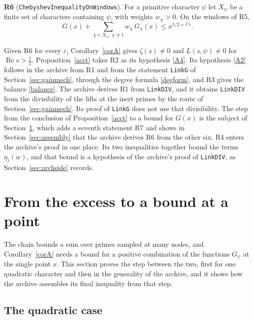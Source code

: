 \documentclass[11pt,letterpaper]{article}
\numberwithin{equation}{section}
\begin{document}
\noindent\textbf{R6} (\texttt{ChebyshevInequalityOnWindows}). For a primitive character $\psi$ let $X_\psi$ be a finite set of characters containing $\psi$, with weights $w_\chi>0$. On the windows of R5,
\[
G(x)+\sum_{\chi\in X_\psi,\ \chi\ne1}w_\chi\,G_\chi(x)\le x^{1/2+C\varepsilon}.
\]

\medskip
Given R6 for every $\varepsilon$, Corollary~\ref{corA} gives $\zeta(s)\ne0$ and $L(s,\psi)\ne0$ for $\operatorname{Re}s>\tfrac12$. Proposition~\ref{acct} takes R2 as its hypothesis \eqref{A4}. Its hypothesis \eqref{A2} follows in the archive from R1 and from the statement \texttt{LinkG} of Section~\ref{sec:gainmech}, through the degree formula \eqref{degform}, and R3 gives the balance \eqref{balance}. The archive derives R1 from \texttt{LinkDIV}, and it obtains \texttt{LinkDIV} from the divisibility of the lifts at the inert primes by the route of Section~\ref{sec:gainmech}. Its proof of \texttt{LinkG} does not use that divisibility. The step from the conclusion of Proposition~\ref{acct} to a bound for $G(x)$ is the subject of Section~\ref{sec:point}, which adds a seventh statement R7 and shows in Section~\ref{sec:assembly} that the archive derives R6 from the other six. R4 enters the archive's proof in one place. Its two inequalities together bound the terms $\eta_j(w)$, and that bound is a hypothesis of the archive's proof of \texttt{LinkDIV}, as Section~\ref{sec:archside} records.

\section{From the excess to a bound at a point}\label{sec:point}

The chain bounds a sum over primes sampled at many nodes, and Corollary~\ref{corA} needs a bound for a positive combination of the functions $G_\psi$ at the single point $x$. This section proves the step between the two, first for one quadratic character and then in the generality of the archive, and it shows how the archive assembles its final inequality from that step.

\subsection{The quadratic case}\label{sec:link}
\end{document}
